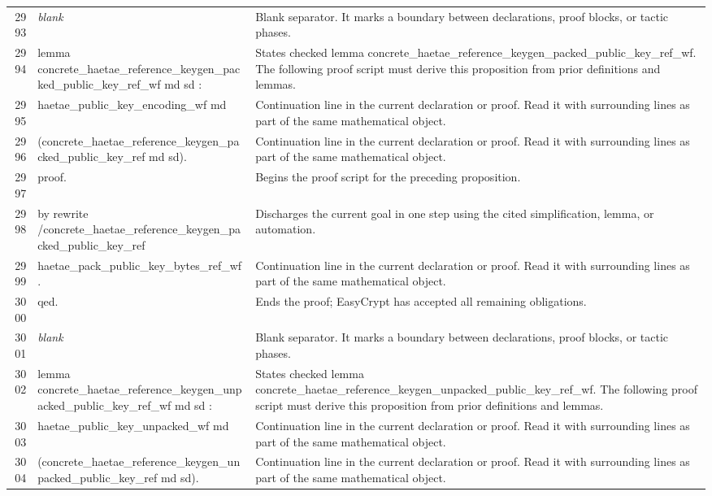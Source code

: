\documentclass[10pt]{article}
\begin{document}
\begin{longtable}{r L{0.53\textwidth} L{0.37\textwidth}}
2993 & {\ttfamily\scriptsize \emph{blank}} & Blank separator.  It marks a boundary between declarations, proof blocks, or tactic phases. \\
2994 & {\ttfamily\scriptsize lemma concrete\_haetae\_reference\_keygen\_packed\_public\_key\_ref\_wf md sd :} & States checked lemma concrete\_haetae\_reference\_keygen\_packed\_public\_key\_ref\_wf.  The following proof script must derive this proposition from prior definitions and lemmas. \\
2995 & {\ttfamily\scriptsize   haetae\_public\_key\_encoding\_wf md} & Continuation line in the current declaration or proof.  Read it with surrounding lines as part of the same mathematical object. \\
2996 & {\ttfamily\scriptsize     (concrete\_haetae\_reference\_keygen\_packed\_public\_key\_ref md sd).} & Continuation line in the current declaration or proof.  Read it with surrounding lines as part of the same mathematical object. \\
2997 & {\ttfamily\scriptsize proof.} & Begins the proof script for the preceding proposition. \\
2998 & {\ttfamily\scriptsize by rewrite /concrete\_haetae\_reference\_keygen\_packed\_public\_key\_ref} & Discharges the current goal in one step using the cited simplification, lemma, or automation. \\
2999 & {\ttfamily\scriptsize            haetae\_pack\_public\_key\_bytes\_ref\_wf.} & Continuation line in the current declaration or proof.  Read it with surrounding lines as part of the same mathematical object. \\
3000 & {\ttfamily\scriptsize qed.} & Ends the proof; EasyCrypt has accepted all remaining obligations. \\
3001 & {\ttfamily\scriptsize \emph{blank}} & Blank separator.  It marks a boundary between declarations, proof blocks, or tactic phases. \\
3002 & {\ttfamily\scriptsize lemma concrete\_haetae\_reference\_keygen\_unpacked\_public\_key\_ref\_wf md sd :} & States checked lemma concrete\_haetae\_reference\_keygen\_unpacked\_public\_key\_ref\_wf.  The following proof script must derive this proposition from prior definitions and lemmas. \\
3003 & {\ttfamily\scriptsize   haetae\_public\_key\_unpacked\_wf md} & Continuation line in the current declaration or proof.  Read it with surrounding lines as part of the same mathematical object. \\
3004 & {\ttfamily\scriptsize     (concrete\_haetae\_reference\_keygen\_unpacked\_public\_key\_ref md sd).} & Continuation line in the current declaration or proof.  Read it with surrounding lines as part of the same mathematical object. \\

\end{longtable}
\end{document}
